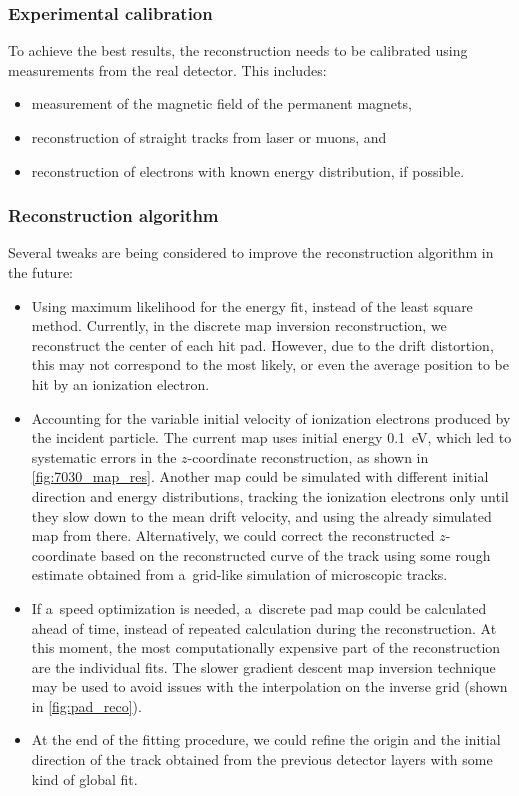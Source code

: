 	\subsubsection*{Experimental calibration}
		To achieve the best results, the reconstruction needs to be calibrated using measurements from the real detector. This includes:
		\begin{itemize}
			\item measurement of the magnetic field of the permanent magnets,
			\item reconstruction of straight tracks from laser or muons, and
			\item reconstruction of electrons with known energy distribution, if possible.
		\end{itemize}
		
	\subsubsection*{Reconstruction algorithm}
		Several tweaks are being considered to improve the reconstruction algorithm in the future:
		\begin{itemize}
			\item Using maximum likelihood for the energy fit, instead of the least square method. Currently, in the discrete map inversion reconstruction, we reconstruct the center of each hit pad. However, due to the drift distortion, this may not correspond to the most likely, or even the average position to be hit by an ionization electron.
			\item Accounting for the variable initial velocity of ionization electrons produced by the incident particle. The current map uses initial energy \qty{0.1}{\eV}, which led to systematic errors in the $z$\nobreakdash-coordinate reconstruction, as shown in \cref{fig:7030_map_res}. Another map could be simulated with different initial direction and energy distributions, tracking the ionization electrons only until they slow down to the mean drift velocity, and using the already simulated map from there. Alternatively, we could correct the reconstructed $z$\nobreakdash-coordinate based on the reconstructed curve of the track using some rough estimate obtained from a~grid-like simulation of microscopic tracks.
			\item If a~speed optimization is needed, a~discrete pad map could be calculated ahead of time, instead of repeated calculation during the reconstruction. At this moment, the most computationally expensive part of the reconstruction are the individual fits. The slower gradient descent map inversion technique may be used to avoid issues with the interpolation on the inverse grid (shown in \cref{fig:pad_reco}).
			\item At the end of the fitting procedure, we could refine the origin and the initial direction of the track obtained from the previous detector layers with some kind of global fit.
		\end{itemize}
		
